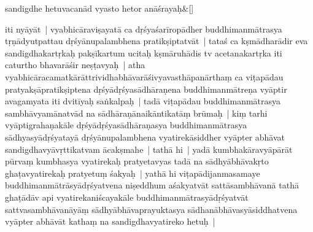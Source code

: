 \documentclass[article,12pt,a4paper]{memoir}%
\newcounter{parCount}
\begin{document}
	    
	    \stanza[\smallbreak]
	  sandigdhe hetuvacanād vyasto hetor anāśrayaḥ\&[\smallbreak]
	  
	  
	  

	  
	  \pstart \leavevmode%
	iti nyāyāt | vyabhicāraviṣayatā ca dṛśyaśarīropādher buddhimanmātrasya tṛṇādyutpattau dṛśyānupalambhena pratikṣiptatvāt | tataś ca kṣmādharādir eva sandigdhakartṛkaḥ pakṣīkartum ucitaḥ kṣmāruhādis tv acetanakartṛka iti caturtho bhavarāśir neṣṭavyaḥ | atha vyabhicāracamat\label{ratnakīrtinibandhāvali__36r1PF7IMW2MOB8FDBO73BBUMXX}kārāttri\label{ratnakīrtinibandhāvali__36r1PF7IMW1RSAP4VW0YYBRBY6Z}vidhabhāvarāśivyavasthāpanārthaṃ ca viṭapādau pratyakṣāpratikṣiptena dṛśyādṛśyasādhāraṇena buddhimanmātreṇa vyāptir avagamyata iti dvitīyaḥ saṅkalpaḥ | tadā viṭapādau buddhimanmātrasya sambhāvyamānatvād na sādhāraṇānaikāntikatāṃ brūmaḥ | kiṃ tarhi vyāptigrahaṇakāle dṛśyādṛśyasādhāraṇasya buddhimanmātrasya sādhyasyādṛśyatayā dṛśyānupalambhena vyatirekāsiddher vyāpter abhāvat sandigdhavyāvṛttikatvam ācakṣmahe | tathā hi | yadā kumbhakāravyāpārāt pūrvaṃ kumbhasya vyatirekaḥ pratyetavyas tadā na sādhyābhāvakṛto ghaṭavyatirekaḥ pratyetuṃ śakyaḥ | yathā hi viṭapādijanmasamaye buddhimanmātrāsyādṛśyatvena niṣeddhum aśakyatvāt sattāsambhāvanā tathā ghaṭādāv api vyatirekaniścayakāle buddhimanmātrasyādṛśyatvāt sattvasambhāvanāyāṃ sādhyābhāvaprayuktasya sādhanābhāvasyāsiddhatvena vyāpter abhāvāt kathaṃ na sandigdhavyatireko hetuḥ |
	{}
	\pend%
      
\end{document}
